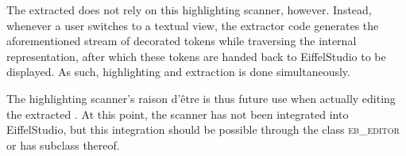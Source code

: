 The extracted \bon{} does not rely on this highlighting scanner, however. Instead, whenever a user switches to a textual \bon{} view, the extractor code generates the aforementioned stream of decorated tokens while traversing the internal \bon{} representation, after which these tokens are handed back to EiffelStudio to be displayed. As such, highlighting and extraction is done simultaneously.

The highlighting scanner's raison d'\^etre is thus future use when actually editing the extracted \bon{}. At this point, the scanner has not been integrated into EiffelStudio, but this integration should be possible through the class \textsc{eb\_editor} or has subclass thereof.
